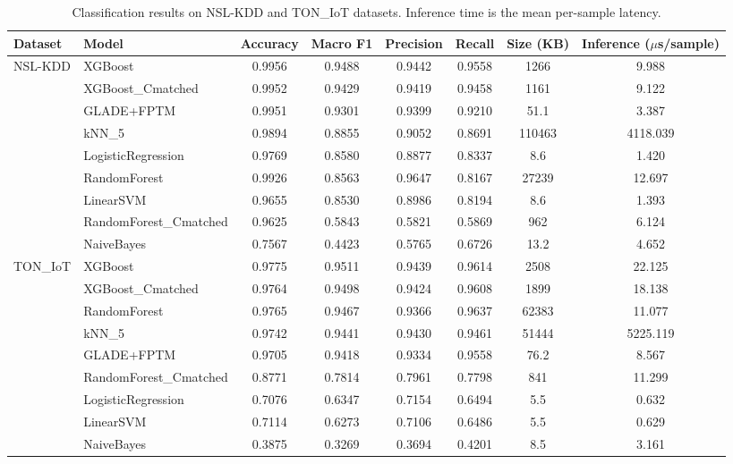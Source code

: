 \documentclass[journal,twoside,web]{ieeecolor}
\begin{document}
\begin{table}[t]
\centering
\caption{Classification results on NSL-KDD and TON\_IoT datasets.
Inference time is the mean per-sample latency.}
\label{tab:results_part1}
\begin{tabular}{llcccccc}
\hline
\textbf{Dataset} & \textbf{Model} & \textbf{Accuracy} & \textbf{Macro F1} & \textbf{Precision} & \textbf{Recall} & \textbf{Size (KB)} & \textbf{Inference ($\mu$s/sample)} \\
\hline

\multirow{9}{*}{NSL-KDD}
 & XGBoost                & 0.9956 & 0.9488 & 0.9442 & 0.9558 & 1266 & 9.988 \\
 & XGBoost\_Cmatched      & 0.9952 & 0.9429 & 0.9419 & 0.9458 & 1161 & 9.122 \\
 & GLADE+FPTM             & 0.9951 & 0.9301 & 0.9399 & 0.9210 & 51.1 & 3.387 \\
 & kNN\_5                 & 0.9894 & 0.8855 & 0.9052 & 0.8691 & 110463 & 4118.039 \\
 & LogisticRegression     & 0.9769 & 0.8580 & 0.8877 & 0.8337 & 8.6  & 1.420 \\
 & RandomForest           & 0.9926 & 0.8563 & 0.9647 & 0.8167 & 27239 & 12.697 \\
 & LinearSVM              & 0.9655 & 0.8530 & 0.8986 & 0.8194 & 8.6  & 1.393 \\
 & RandomForest\_Cmatched & 0.9625 & 0.5843 & 0.5821 & 0.5869 & 962  & 6.124 \\
 & NaiveBayes             & 0.7567 & 0.4423 & 0.5765 & 0.6726 & 13.2 & 4.652 \\
\hline

\multirow{9}{*}{TON\_IoT}
 & XGBoost                & 0.9775 & 0.9511 & 0.9439 & 0.9614 & 2508 & 22.125 \\
 & XGBoost\_Cmatched      & 0.9764 & 0.9498 & 0.9424 & 0.9608 & 1899 & 18.138 \\
 & RandomForest           & 0.9765 & 0.9467 & 0.9366 & 0.9637 & 62383 & 11.077 \\
 & kNN\_5                 & 0.9742 & 0.9441 & 0.9430 & 0.9461 & 51444 & 5225.119 \\
 & GLADE+FPTM             & 0.9705 & 0.9418 & 0.9334 & 0.9558 & 76.2 & 8.567 \\
 & RandomForest\_Cmatched & 0.8771 & 0.7814 & 0.7961 & 0.7798 & 841  & 11.299 \\
 & LogisticRegression     & 0.7076 & 0.6347 & 0.7154 & 0.6494 & 5.5  & 0.632 \\
 & LinearSVM              & 0.7114 & 0.6273 & 0.7106 & 0.6486 & 5.5  & 0.629 \\
 & NaiveBayes             & 0.3875 & 0.3269 & 0.3694 & 0.4201 & 8.5  & 3.161 \\
\hline
\end{tabular}
\end{table}
\end{document}

